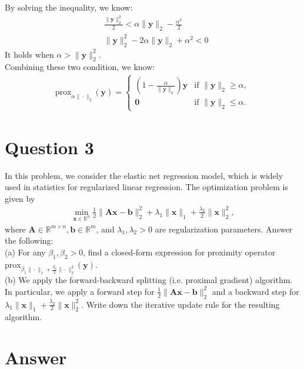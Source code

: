 \documentclass{article}
\newcommand{\R}{\mathbb{R}}
\begin{document}
By solving the inequality, we know:
\begin{align*}
    &\frac{\|\bm{y}\|_2^2}{2} <  \alpha\|\bm{y}\|_2 - \frac{\alpha^2}{2} \\
    &\|\bm{y}\|_2^2 - 2\alpha\|\bm{y}\|_2 + \alpha^2 < 0
\end{align*}
It holds when \(\alpha > \|\bm{y}\|_2^2\).  \\
Combining these two condition, we know:
\begin{align*}
    \text{prox}_{\alpha \|\cdot\|_2}(\bm{y}) = \begin{cases}
        \left(1 - \frac{\alpha}{\|\bm{y}\|_2} \right)\bm{y} &\text{if }\|\bm{y}\|_2 \geq \alpha, \\
        \bm{0} &\text{if } \|\bm{y}\|_2 \leq \alpha.
    \end{cases}
\end{align*}








\section*{Question 3}
In this problem, we consider the elastic net regression model, which is widely used in statistics for regularized linear regression. The optimization problem is given by
\begin{align*}
    \min_{\bm{x}\in\R^n} \frac{1}{2} \|\bm{A}\bm{x} - \bm{b}\|_2^2 + \lambda_1\|\bm{x}\|_1 + \frac{\lambda_2}{2}\|\bm{x}\|_2^2,
\end{align*}
where \(\bm{A} \in \R^{m \times n}, \bm{b} \in \R^m\), and \(\lambda_1, \lambda_2 > 0\) are regularization parameters. Answer the following: \\
(a) For any \(\beta_1, \beta_2 > 0\), find a closed-form expression for proximity operator \(\text{prox}_{\beta_1\|\cdot\|_1 + \frac{\beta_2}{2}\|\cdot\|_2^2}(\bm{y})\). \\
(b) We apply the forward-backward splitting (i.e. proximal gradient) algorithm. In particular, we apply a forward step for \(\frac{1}{2} \|\bm{A}\bm{x} - \bm{b}\|_2^2\) and a backward step for \(\lambda_1\|\bm{x}\|_1 + \frac{\lambda_2}{2}\|\bm{x}\|_2^2\). Write down the iterative update rule for the resulting algorithm.


\section*{Answer}
\end{document}
